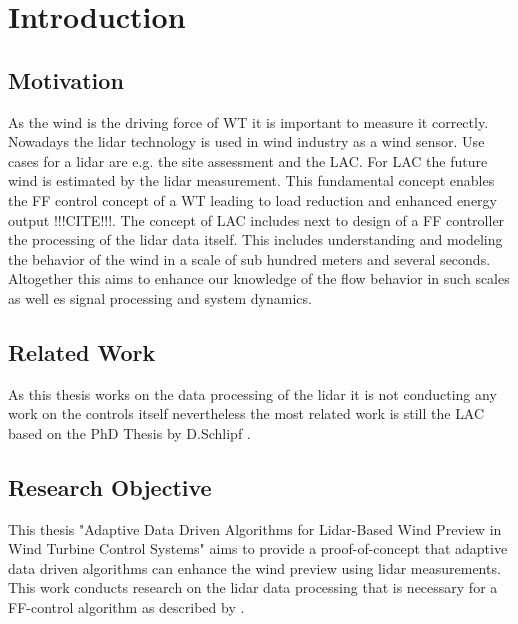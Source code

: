 \chapter{Introduction} \label{cha:INT}
\section{Motivation}\label{sec:Mot}
As the wind is the driving force of \gls{WT} it is important to measure it correctly. Nowadays the \gls{lidar} technology is used in wind industry as a wind sensor. Use cases for a \gls{lidar} are e.g. the site assessment and the \gls{LAC}. For \gls{LAC} the future wind is estimated by the \gls{lidar} measurement. This fundamental concept enables the \gls{FF} control concept of a \gls{WT} leading to load reduction and enhanced energy output !!!CITE!!!. The concept of \gls{LAC} includes next to design of a \gls{FF} controller the processing of the \gls{lidar} data itself. This includes understanding and modeling the behavior of the wind in a scale of sub hundred meters and several seconds. Altogether this aims to enhance our knowledge of the flow behavior in such scales as well es signal processing and system dynamics.

\section{Related Work}\label{sec:RelWork}
As this thesis works on the data processing of the \gls{lidar} it is not conducting any work on the controls itself nevertheless the most related work is still the \gls{LAC} based on the PhD Thesis by D.Schlipf \cite{Schlipf2015}.  







\section{Research Objective}\label{sec:ResObj}
This thesis "Adaptive Data Driven Algorithms for Lidar-Based Wind Preview in Wind Turbine Control Systems" aims to provide a proof-of-concept that adaptive data driven algorithms can enhance the wind preview using lidar measurements. This work conducts research on the lidar data processing that is necessary for a \gls{FF}-control algorithm as described by \cite{Schlipf2015}.